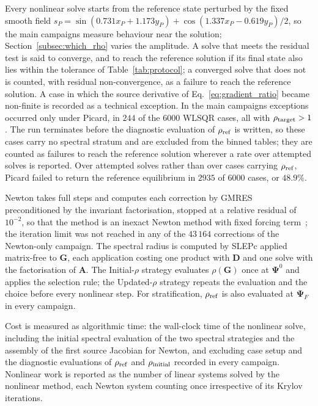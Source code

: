 Every nonlinear solve starts from the reference state perturbed by the fixed smooth field $s_P=\sin(0.731x_P+1.173y_P)+\cos(1.337x_P-0.619y_P) / 2$, so the main campaigns measure behaviour near the solution; Section~\ref{subsec:which_rho} varies the amplitude. A solve that meets the residual test is said to converge, and to reach the reference solution if its final state also lies within the tolerance of Table~\ref{tab:protocol}; a converged solve that does not is counted, with residual non-convergence, as a failure to reach the reference solution. A case in which the source derivative of Eq.~\eqref{eq:gradient_ratio} became non-finite is recorded as a technical exception. In the main campaigns exceptions occurred only under Picard, in $244$ of the $6000$ WLSQR cases, all with $\rho_{\rm target}>1$. The run terminates before the diagnostic evaluation of $\rho_{\rm ref}$ is written, so these cases carry no spectral stratum and are excluded from the binned tables; they are counted as failures to reach the reference solution wherever a rate over attempted solves is reported. Over attempted solves rather than over cases carrying $\rho_{\rm ref}$, Picard failed to return the reference equilibrium in $2935$ of $6000$ cases, or $48.9\%$.

Newton takes full steps and computes each correction by GMRES~\cite{Saad1986GMRES:Systems} preconditioned by the invariant factorisation, stopped at a relative residual of $10^{-2}$, so that the method is an inexact Newton method with fixed forcing term~\cite{Dembo1982InexactMethods}; the iteration limit was not reached in any of the $43\,164$ corrections of the Newton-only campaign. The spectral radius is computed by SLEPc applied matrix-free to $\mathbf{G}$, each application costing one product with $\mathbf{D}$ and one solve with the factorisation of $\mathbf{A}$. The Initial-$\rho$ strategy evaluates $\rho(\mathbf{G})$ once at $\bm{\Psi}^{0}$ and applies the selection rule; the Updated-$\rho$ strategy repeats the evaluation and the choice before every nonlinear step. For stratification, $\rho_{\rm ref}$ is also evaluated at $\bm{\Psi}_F$ in every campaign.

Cost is measured as algorithmic time: the wall-clock time of the nonlinear solve, including the initial spectral evaluation of the two spectral strategies and the assembly of the first source Jacobian for Newton, and excluding case setup and the diagnostic evaluations of $\rho_{\rm ref}$ and $\rho_{\rm initial}$ recorded in every campaign. Nonlinear work is reported as the number of linear systems solved by the nonlinear method, each Newton system counting once irrespective of its Krylov iterations.



